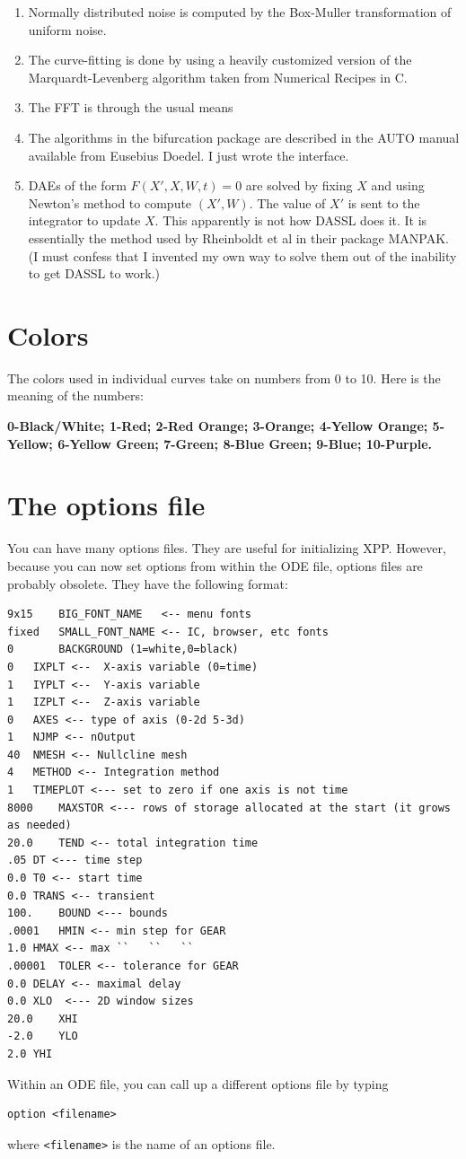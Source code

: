 \documentclass{article}
\newcommand{\bvb}{\begin{verbatim}}
\begin{document}
\begin{enumerate}
\item Normally distributed noise is computed by the Box-Muller
transformation of uniform noise.
\item The curve-fitting is done by using a heavily customized version
of the Marquardt-Levenberg algorithm taken from Numerical Recipes in
C. 
\item The FFT is through the usual means
\item The algorithms in the bifurcation package are described in the
AUTO manual available from Eusebius Doedel.  I just wrote the
interface.
\item DAEs of the form $F(X',X,W,t)=0$ are solved by fixing $X$ and
using Newton's method to compute $(X',W)$.  The value of $X'$ is sent
to the integrator to update $X.$  This apparently is not how DASSL
does it.  It is essentially the method used by Rheinboldt et al in
their package MANPAK. (I must confess that I invented my own way to
solve them out of the inability to get DASSL to work.)
\end{enumerate}
 
\section{Colors}
The colors used in individual curves take on numbers from 0 to 10. Here is
the meaning of the numbers:

{\bf 0-Black/White; 1-Red; 2-Red Orange; 3-Orange;
4-Yellow Orange; 5-Yellow; 6-Yellow Green; 7-Green; 8-Blue Green; 9-Blue;
10-Purple.}

\section{The options file}
\label{optfiles}
You can have many options files.  They are useful for initializing
XPP. However, because you can now set options from within the ODE
file, options files are probably obsolete. They have the following format:
\bvb
9x15    BIG_FONT_NAME   <-- menu fonts
fixed   SMALL_FONT_NAME <-- IC, browser, etc fonts
0       BACKGROUND (1=white,0=black)
0	IXPLT <--  X-axis variable (0=time)
1	IYPLT <--  Y-axis variable
1	IZPLT <--  Z-axis variable
0	AXES <-- type of axis (0-2d 5-3d)
1	NJMP <-- nOutput
40	NMESH <-- Nullcline mesh
4	METHOD <-- Integration method
1	TIMEPLOT <--- set to zero if one axis is not time
8000	MAXSTOR <--- rows of storage allocated at the start (it grows as needed)
20.0	TEND <-- total integration time
.05	DT <--- time step
0.0	T0 <-- start time
0.0	TRANS <-- transient
100.	BOUND <--- bounds
.0001	HMIN <-- min step for GEAR
1.0	HMAX <-- max ``   ``   ``
.00001	TOLER <-- tolerance for GEAR
0.0	DELAY <-- maximal delay
0.0	XLO  <--- 2D window sizes
20.0	XHI
-2.0	YLO
2.0	YHI
\end{verbatim}

Within an ODE file, you can call up a different options file by
typing
\bvb
option <filename>
\end{verbatim}
where {\tt <filename>} is the name of an options file.
  
\end{document}

